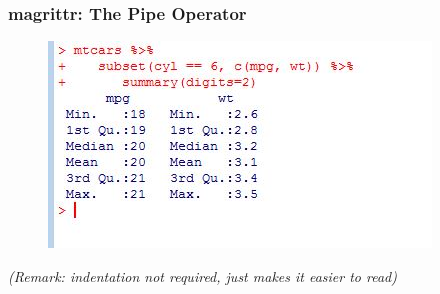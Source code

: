 \documentclass{beamer}
\begin{document}
\begin{frame}
\frametitle{magrittr: The Pipe Operator}
\large	
\begin{figure}
\centering
\includegraphics[width=0.99\linewidth]{images/magrittrcode02}

\end{figure}
\textit{(Remark: indentation not required, just makes it easier to read)}
\end{frame}
%	
\end{document}
